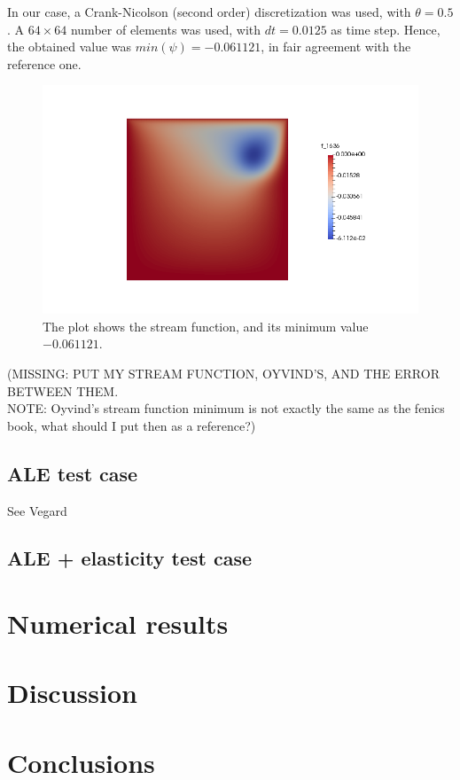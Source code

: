 \documentclass[11pt,a4paper,titlepage]{report}
\begin{document}
In our case, a Crank-Nicolson (second order) discretization was used, with $\theta = 0.5$. A $64 \times 64$ number of elements was used, with $dt = 0.0125$ as time step. Hence, the obtained value was $min(\psi) = -0.061 121$, in fair agreement with the reference one. \\

\vspace{-.3cm}
\begin{figure}[ht]
\centering
\includegraphics[width=\textwidth]{images/mine.png}
\vspace{-1cm}
\caption{The plot shows the stream function, and its minimum value $-0.061 121$.}
\end{figure}

(MISSING: PUT MY STREAM FUNCTION, OYVIND'S, AND THE ERROR BETWEEN THEM. \\
NOTE: Oyvind's stream function minimum is not exactly the same as the fenics book, what should I put then as a reference?)


\section{ALE test case}
See Vegard
\section{ALE + elasticity test case}

\chapter{Numerical results}

\chapter{Discussion}

\chapter{Conclusions}
\end{document}

